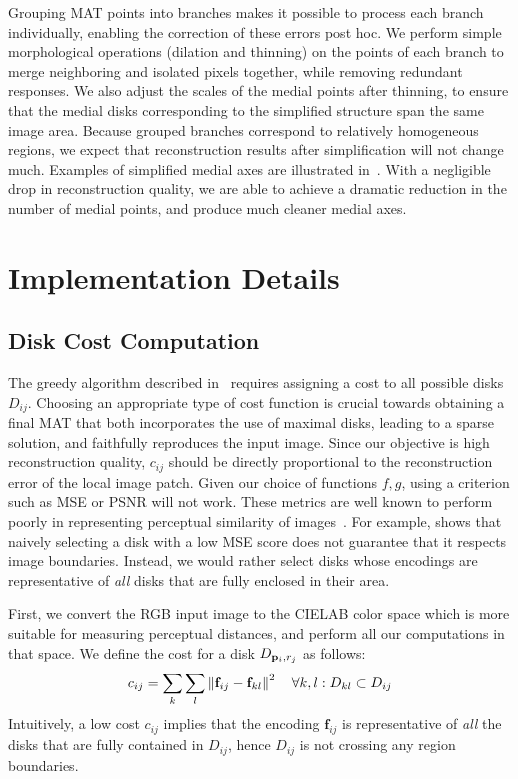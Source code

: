 \documentclass[10pt,twocolumn,letterpaper]{article}
\begin{document}
Grouping MAT points into branches makes it possible to process each branch individually, enabling
the correction of these errors post hoc.
We perform simple morphological operations (dilation and thinning) 
on the points of each branch to merge neighboring and isolated pixels together, while removing 
redundant responses. 
We also adjust the scales of the medial points after thinning, to ensure that the medial disks corresponding 
to the simplified structure span the same image area.
Because grouped branches correspond to relatively homogeneous regions, we expect that reconstruction
results after simplification will not change much.
Examples of simplified medial axes are illustrated in~.
With a negligible drop in reconstruction quality, we are able to achieve a dramatic reduction
in the number of medial points, and produce much cleaner medial axes.


\section{Implementation Details}\label{sec:implementation}
\subsection{Disk Cost Computation}\label{sec:implementation:diskcost}
The greedy algorithm described in~ requires assigning a cost to all possible disks $D_{ij}$.
Choosing an appropriate type of cost function is crucial towards obtaining a final MAT that both incorporates
the use of maximal disks, leading to a sparse solution, and faithfully reproduces the input image.
Since our objective is high reconstruction quality, $c_{ij}$ should be directly proportional
to the reconstruction error of the local image patch.
Given our choice of functions $f,g$, using a criterion such as MSE or PSNR will not work.
These metrics are well known to perform poorly in representing perceptual similarity of images~\cite{girod1993what,wang2009mean}.
For example,  shows that naively selecting a disk with a low MSE score does not guarantee that it 
respects image boundaries.
Instead, we would rather select disks whose encodings are representative of \emph{all} disks that are fully enclosed
in their area. 

First, we convert the RGB input image to the CIELAB color space which is more suitable for measuring perceptual distances,
and perform all our computations in that space.
We define the cost for a disk $D_{\mathbf{p}_{i},r_j}$ as follows:
\begin{equation}
c_{ij} = \sum_k \sum_l \left \lVert \mathbf{f}_{ij} - \mathbf{f}_{kl}  \right \rVert^2 \quad \forall k,l: D_{kl} \subset D_{ij}
\label{eq:diskcost}
\end{equation}
Intuitively, a low cost $c_{ij}$ implies that the encoding $\mathbf{f}_{ij}$ is representative of \emph{all}
the disks that are fully contained in $D_{ij}$, hence $D_{ij}$ is not crossing any region boundaries.
\end{document}
